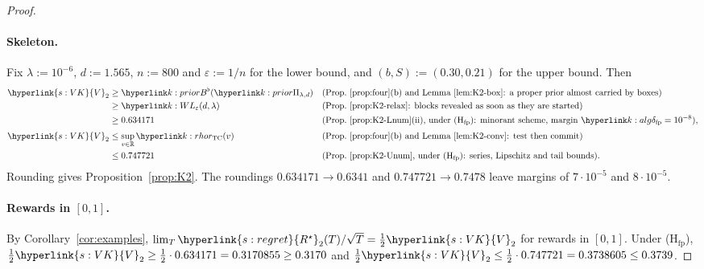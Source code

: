 \documentclass[11pt]{article}
\DeclareRobustCommand{\sy}[2]{{\hyperlink{#1}{#2}}}
\newcommand{\R}{\mathbb{R}}
\newcommand{\1}{\mathbf{1}}
\newcommand{\Rs}{\sy{s:regret}{R^\star}}
\newcommand{\VK}{\sy{s:VK}{V}}
\begin{document}
\begin{proof}
\paragraph{Skeleton.} Fix $\lambda:=10^{-6}$, $d:=1.565$, $n:=800$ and $\varepsilon:=1/n$ for the lower bound, and $(b,S):=(0.30,0.21)$ for the upper bound. Then
\begin{align*}
\VK_2&\ge\kBb(\kPri) && \text{(Prop.~\ref{prop:four}(b) and Lemma~\ref{lem:K2-box}: a proper prior almost carried by boxes)}\\
&\ge\kL(d,\lambda) && \text{(Prop.~\ref{prop:K2-relax}: blocks revealed as soon as they are started)}\\
&\ge0.634171 && \text{(Prop.~\ref{prop:K2-Lnum}(ii), under (H$_{\mathrm{fp}}$): minorant scheme, margin $\kdfp=10^{-8}$)},\\[3pt]
\VK_2&\le\sup_{v\in\R}\kr(v) && \text{(Prop.~\ref{prop:four}(b) and Lemma~\ref{lem:K2-conv}: test then commit)}\\
&\le0.747721 && \text{(Prop.~\ref{prop:K2-Unum}, under (H$_{\mathrm{fp}}$): series, Lipschitz and tail bounds)}.
\end{align*}
Rounding gives Proposition~\ref{prop:K2}. The roundings $0.634171\to0.6341$ and $0.747721\to0.7478$ leave margins of $7\cdot10^{-5}$ and $8\cdot10^{-5}$.

\paragraph{Rewards in $[0,1]$.} By Corollary~\ref{cor:examples}, $\lim_T\Rs_2(T)/\sqrt T=\frac12\VK_2$ for rewards in $[0,1]$. Under (H$_{\mathrm{fp}}$),
$\frac12\VK_2\ge\frac12\cdot0.634171=0.3170855\ge0.3170$ and $\frac12\VK_2\le\frac12\cdot0.747721=0.3738605\le0.3739$.


\end{proof}
\end{document}
